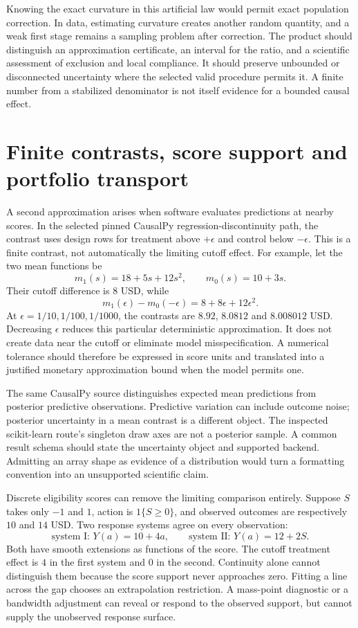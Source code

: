 Knowing the exact curvature in this artificial law would permit exact
population correction. In data, estimating curvature creates another random
quantity, and a weak first stage remains a sampling problem after correction.
The product should distinguish an approximation certificate, an interval for
the ratio, and a scientific assessment of exclusion and local compliance.
It should preserve unbounded or disconnected uncertainty where the selected
valid procedure permits it. A finite number from a stabilized denominator is
not itself evidence for a bounded causal effect.

\section{Finite contrasts, score support and portfolio transport}
\label{exec17:s4-support}

A second approximation arises when software evaluates predictions at nearby
scores. In the selected pinned CausalPy regression-discontinuity path, the
contrast uses design rows for treatment above $+\epsilon$ and control below
$-\epsilon$. This is a finite contrast, not automatically the limiting
cutoff effect. For example, let the two mean functions be
\[
 m_1(s)=18+5s+12s^2,\qquad m_0(s)=10+3s.
\]
Their cutoff difference is $8$ USD, while
\[
 m_1(\epsilon)-m_0(-\epsilon)=8+8\epsilon+12\epsilon^2.
\]
At $\epsilon=1/10,1/100,1/1000$, the contrasts are $8.92$, $8.0812$ and
$8.008012$ USD. Decreasing $\epsilon$ reduces this particular deterministic
approximation. It does not create data near the cutoff or eliminate model
misspecification. A numerical tolerance should therefore be expressed in
score units and translated into a justified monetary approximation bound
when the model permits one.~\citep{exec14_causalpy_primary,exec17_s4_math}

The same CausalPy source distinguishes expected mean predictions from
posterior predictive observations. Predictive variation can include outcome
noise; posterior uncertainty in a mean contrast is a different object.
The inspected scikit-learn route's singleton draw axes are not a posterior
sample. A common result schema should state the uncertainty object and
supported backend. Admitting an array shape as evidence of a distribution
would turn a formatting convention into an unsupported scientific claim.
\citep{exec14_causalpy_primary,exec17_s4_paths}

Discrete eligibility scores can remove the limiting comparison entirely.
Suppose $S$ takes only $-1$ and $1$, action is $1\{S\geq0\}$, and observed
outcomes are respectively $10$ and $14$ USD. Two response systems agree on
every observation:
\[
 \text{system I: }Y(a)=10+4a,\qquad
 \text{system II: }Y(a)=12+2S.
\]
Both have smooth extensions as functions of the score. The cutoff treatment
effect is $4$ in the first system and $0$ in the second. Continuity alone
cannot distinguish them because the score support never approaches zero.
Fitting a line across the gap chooses an extrapolation restriction. A
mass-point diagnostic or a bandwidth adjustment can reveal or respond to
the observed support, but cannot supply the unobserved response surface.
\citep{exec17_s4_math}

